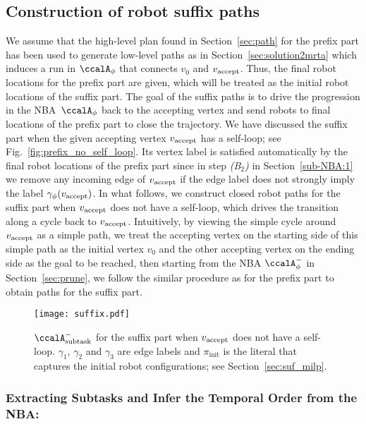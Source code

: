 \documentclass[Afour,sageh,times]{sagej}
\newcommand{\auto}[1]{\ccalA_{\textup{#1}}}
\newcommand{\autop}{\ccalA_{\phi}}
\newcommand{\vertex}[1]{v_{\textup{#1}}}
\begin{document}
{{{\subsection{Construction of robot suffix paths}\label{sec:suf}
We assume that the high-level plan found in Section~\ref{sec:path} for the prefix part  has been used to generate low-level paths as in Section~\ref{sec:solution2mrta} which induces a run in $\autop$ that connects $v_0$ and $\vertex{accept}$. Thus, the final robot locations for the prefix part are given, which will be treated as the initial robot locations of the suffix part. The goal of the suffix paths is to drive the progression in the NBA~$\autop$ back to the accepting vertex and send robots to final locations of the prefix part to close the trajectory.
 We have discussed the suffix part when the given accepting vertex $\vertex{accept}$ has a self-loop; see Fig.~\ref{fig:prefix_no_self_loop}. Its vertex label is satisfied automatically by the final robot locations of the prefix part since in step {\it (B$_2$)} in  Section~\ref{sub-NBA:1} we remove any incoming edge of $\vertex{accept}$ if the edge label does not strongly imply the label $\gamma_{\phi}(\vertex{accept})$. In what follows, we construct closed robot paths for the suffix part when $\vertex{accept}$ does not have a self-loop, which drives the transition along a cycle back to $\vertex{accept}$. Intuitively, by viewing the simple cycle around $\vertex{accept}$ as a simple path, we treat the  accepting vertex on the starting side of this simple path as the initial vertex $v_0$ and the other accepting vertex on the ending side as the goal to be reached, then  starting from the NBA $\autop^-$ in Section~\ref{sec:prune}, we  follow the similar procedure as for the prefix part to obtain paths for the suffix part.

  \begin{figure}[!t]
    \centering
    \texttt{[image: suffix.pdf]}
    \caption{$\auto{subtask}^-$ for the suffix part when $\vertex{accept}$ does not have a self-loop. $\gamma_1$, $\gamma_2$ and $\gamma_3$ are edge labels and $\pi_{\text{init}}$ is the literal that captures the initial robot configurations; see Section~\ref{sec:suf_milp}.}
    \label{fig:suffix}
  \end{figure}

  \subsubsection{Extracting Subtasks and Infer the Temporal Order from the NBA:}\label{sec:suf_prune}
}}}
\end{document}
